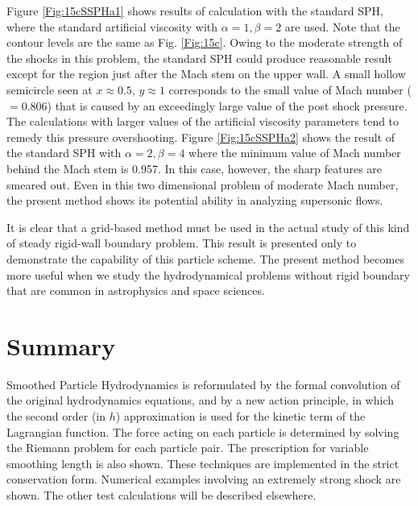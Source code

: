 \documentclass{cjour}
\begin{document}
\begin{article}
Figure \ref{Fig:15cSSPHa1} shows
results of calculation with the standard SPH, where   
the standard artificial viscosity with $\alpha=1,\beta=2$ 
are used.  
Note that the contour levels are the same as Fig. \ref{Fig:15c}. 
Owing to the moderate strength of the shocks in this problem, 
the standard SPH could produce reasonable result except for 
the region just after the Mach stem on the upper wall.  
A small hollow semicircle seen at $x \approx 0.5$, $y \approx 1$ 
corresponds to the small value of Mach number ($=0.806$) 
that is caused by an exceedingly large value of 
the post shock pressure.  
The calculations with larger values of 
the artificial viscosity parameters %
tend to remedy this pressure overshooting.  
Figure \ref{Fig:15cSSPHa2} shows the result of the standard SPH 
with $\alpha=2,\beta=4$ where the minimum value of Mach number 
behind the Mach stem is 0.957. 
In this case, however, the sharp features are smeared out. 
Even in this two dimensional problem of moderate Mach number, 
the present method shows its potential ability in analyzing 
supersonic flows.   

It is clear that a grid-based method must be used 
in the actual study of this kind of steady rigid-wall boundary problem. 
This result is presented only to demonstrate the 
capability of this particle scheme.
The present method becomes more useful when we study the hydrodynamical 
problems without rigid boundary that are common in 
astrophysics and space sciences. 


\section{Summary}
                                                   \label{Sec:Summary}  
Smoothed Particle Hydrodynamics is reformulated by 
the formal convolution of the original hydrodynamics equations,  
and by a new action principle, in which the second order (in $h$) 
approximation is used for the kinetic term of the 
Lagrangian function.  
The force acting on each particle is determined by solving the 
Riemann problem for each particle pair. 
The prescription for variable smoothing length is also shown. 
These techniques are implemented in the strict conservation form. 
Numerical examples involving an extremely strong shock are shown. 
The other test calculations will be described elsewhere. 


\end{article}
\end{document}
